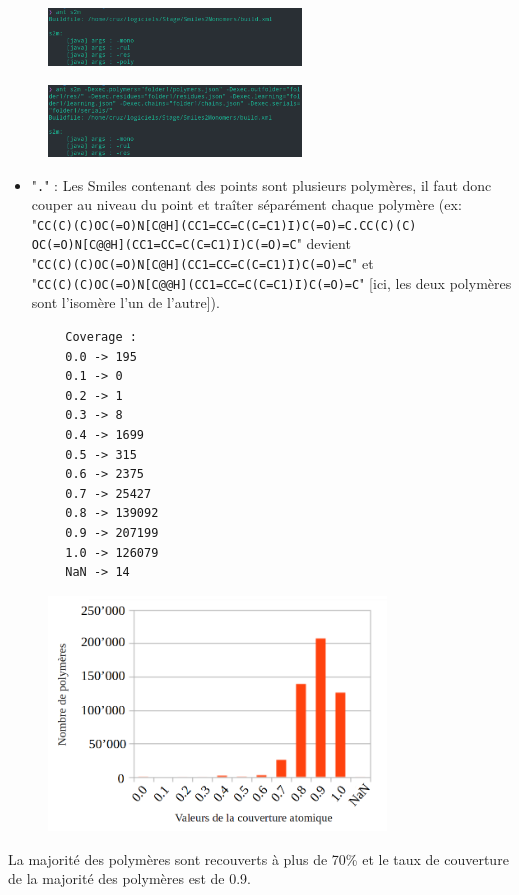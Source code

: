 \documentclass[11pt, a4paper]{report}
\begin{document}
	\begin{figure}[H]
		\captionsetup{justification=centering}
		\centering
		\includegraphics[width=0.6\textwidth]{images/ants2m.png}
	\end{figure}
	\vspace{0.000000000001cm}
	\begin{figure}[H]
		\captionsetup{justification=centering}
		\centering
		\includegraphics[width=0.6\textwidth]{images/ants2m-D.png}
	\end{figure}
	
	\begin{itemize}
		\item "\verb|.|" : Les Smiles contenant des points sont plusieurs polymères, il faut donc couper au niveau du point et traîter séparément chaque polymère (ex:
		\\"\verb|CC(C)(C)OC(=O)N[C@H](CC1=CC=C(C=C1)I)C(=O)=C.CC(C)(C)|\\\verb|OC(=O)N[C@@H](CC1=CC=C(C=C1)I)C(=O)=C|" devient \\"\verb|CC(C)(C)OC(=O)N[C@H](CC1=CC=C(C=C1)I)C(=O)=C|" et\\  "\verb|CC(C)(C)OC(=O)N[C@@H](CC1=CC=C(C=C1)I)C(=O)=C|" [ici, les deux polymères sont l'isomère l'un de l'autre]).
	\end{itemize}
	\begin{lstlisting}
		Coverage :
		0.0 -> 195
		0.1 -> 0
		0.2 -> 1
		0.3 -> 8
		0.4 -> 1699
		0.5 -> 315
		0.6 -> 2375
		0.7 -> 25427
		0.8 -> 139092
		0.9 -> 207199
		1.0 -> 126079
		NaN -> 14
	\end{lstlisting}
	
	
	
	\begin{figure}[H]
		\includegraphics[width=0.8\textwidth]{./images/ACs2m.png}
	\end{figure}
	La majorité des polymères sont recouverts à plus de 70\% et le taux de couverture de la majorité des polymères est de 0.9.
	
	
	
\end{document}
